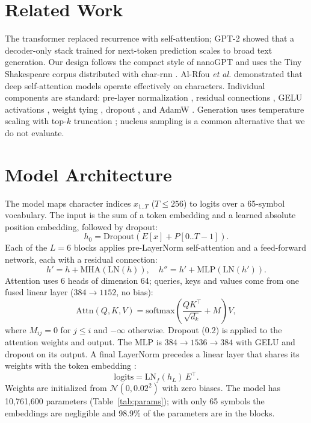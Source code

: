 \documentclass[conference]{IEEEtran}
\begin{document}
\section{Related Work}
The transformer \cite{vaswani2017} replaced recurrence with self-attention; GPT-2 \cite{radford2019} showed that a decoder-only stack
trained for next-token prediction scales to broad text generation. Our design follows the compact style of nanoGPT \cite{karpathy2022}
and uses the Tiny Shakespeare corpus distributed with char-rnn \cite{karpathy2015}. Al-Rfou \emph{et al.} \cite{alrfou2019}
demonstrated that deep self-attention models operate effectively on characters. Individual components are standard: pre-layer
normalization \cite{xiong2020,ba2016}, residual connections \cite{he2016}, GELU activations \cite{hendrycks2016}, weight tying
\cite{press2017}, dropout \cite{srivastava2014}, and AdamW \cite{loshchilov2019}. Generation uses temperature scaling with top-$k$
truncation \cite{fan2018}; nucleus sampling \cite{holtzman2020} is a common alternative that we do not evaluate.

\section{Model Architecture}
The model maps character indices $x_{1..T}$ ($T\le 256$) to logits over a 65-symbol vocabulary. The input is the sum of a token
embedding and a learned absolute position embedding, followed by dropout:
\begin{equation}
h_0 = \mathrm{Dropout}(E[x] + P[0..T{-}1]).
\end{equation}
Each of the $L=6$ blocks applies pre-LayerNorm self-attention and a feed-forward network, each with a residual connection:
\begin{equation}
h' = h + \mathrm{MHA}(\mathrm{LN}(h)),\quad h'' = h' + \mathrm{MLP}(\mathrm{LN}(h')).
\end{equation}
Attention uses 6 heads of dimension 64; queries, keys and values come from one fused linear layer ($384\to1152$, no bias):
\begin{equation}
\mathrm{Attn}(Q,K,V)=\mathrm{softmax}\!\left(\frac{QK^{\top}}{\sqrt{d_k}}+M\right)V,
\end{equation}
where $M_{ij}=0$ for $j\le i$ and $-\infty$ otherwise. Dropout (0.2) is applied to the attention weights and output. The MLP is
$384\to1536\to384$ with GELU and dropout on its output. A final LayerNorm precedes a linear layer that shares its weights with the
token embedding \cite{press2017}:
\begin{equation}
\mathrm{logits}=\mathrm{LN}_f(h_L)\,E^{\top}.
\end{equation}
Weights are initialized from $\mathcal{N}(0,0.02^2)$ with zero biases. The model has 10,761,600 parameters (Table~\ref{tab:params});
with only 65 symbols the embeddings are negligible and 98.9\% of the parameters are in the blocks.
\end{document}
